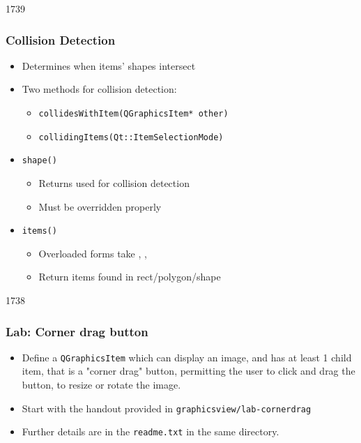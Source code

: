 \begin{slide}{1739}

\frametitle{Collision Detection}
\begin{itemize}
\item Determines when items' shapes intersect
\item Two methods for collision detection:
    \begin{itemize}
    \item \texttt{collidesWithItem(QGraphicsItem* other)}
    \item \texttt{collidingItems(Qt::ItemSelectionMode)}
    \end{itemize}
\item \texttt{shape()}
    \begin{itemize}
    \item Returns  used for collision detection

    \item Must be overridden properly
    \end{itemize}
\item \texttt{items()}
    \begin{itemize}
    \item Overloaded forms take , , 

    \item Return items found in rect/polygon/shape
    \end{itemize}
\end{itemize}

\end{slide}

\begin{slide}{1738}
\frametitle{Lab: Corner drag button}
\begin{itemize}
\item Define a \texttt{QGraphicsItem} which can display an image, and has at least 1 child item, that is a "corner drag" button, permitting the user to click and drag the button, to resize or rotate the image. 
\item Start with the handout provided in \texttt{graphicsview/lab-cornerdrag}
\item Further details are in the \texttt{readme.txt} in the same directory.
\end{itemize}
\end{slide}


